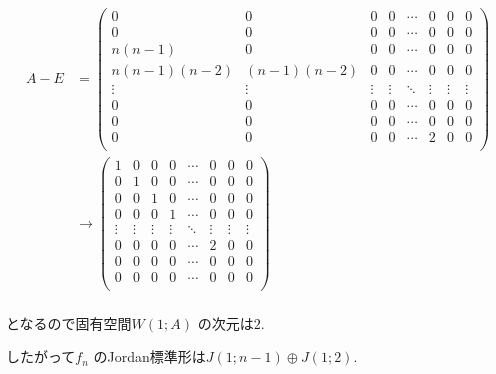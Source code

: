 \documentclass{jsarticle}
\begin{document}
\begin{align*}
A-E &= \begin{pmatrix} 0 & 0 & 0 & 0 & \dotsb & 0 & 0 & 0 \\
                0 & 0 & 0 & 0 & \dotsb & 0 & 0 & 0 \\
                n(n-1) & 0 & 0 & 0 & \dotsb & 0 & 0 & 0 \\
                n(n-1)(n-2) & (n-1)(n-2) & 0 & 0 & \dotsb & 0 & 0 & 0 \\
                \vdots & \vdots & \vdots & \vdots & \ddots & \vdots & \vdots & \vdots \\
                0 & 0 & 0 & 0 & \cdots & 0 & 0 & 0 \\
                0 & 0 & 0 & 0 & \cdots & 0 & 0 & 0 \\
                0 & 0 & 0 & 0 & \cdots & 2 & 0 & 0 \\
                \end{pmatrix} \\
    &\to \begin{pmatrix} 1 & 0 & 0 & 0 & \dotsb & 0 & 0 & 0 \\
                0 & 1 & 0 & 0 & \dotsb & 0 & 0 & 0 \\
                0 & 0 & 1 & 0 & \dotsb & 0 & 0 & 0 \\
                0 & 0 & 0 & 1 & \dotsb & 0 & 0 & 0 \\
                \vdots & \vdots & \vdots & \vdots & \ddots & \vdots & \vdots & \vdots \\
                0 & 0 & 0 & 0 & \cdots & 2 & 0 & 0 \\
                0 & 0 & 0 & 0 & \cdots & 0 & 0 & 0 \\
                0 & 0 & 0 & 0 & \cdots & 0 & 0 & 0 \\
                \end{pmatrix} \\
\end{align*}

となるので固有空間$W(1;A)$ の次元は$2$.

したがって$f_n$ のJordan標準形は$J(1;n-1) \oplus J(1;2)$.
\end{document}
